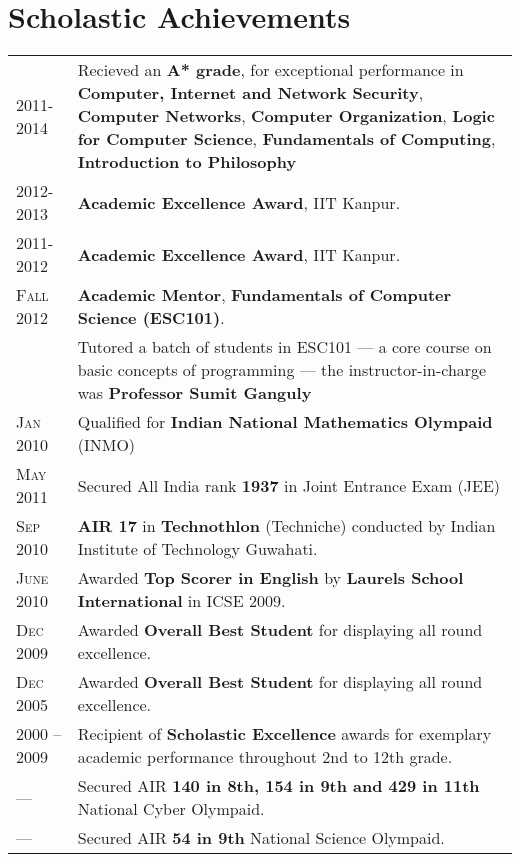\documentclass[a4paper,10pt]{article} %
\begin{document}
\section{Scholastic Achievements}

\begin{tabular}{>{\raggedleft}p{2.2cm}p{15cm}}

    \textsc{2011-2014}   & Recieved an \textbf{A* grade}, for exceptional performance in
                            \textbf{Computer, Internet and Network Security},
                            \textbf{Computer Networks},
                            \textbf{Computer Organization},
                            \textbf{Logic for Computer Science},
                            \textbf{Fundamentals of Computing},
                            \textbf{Introduction to Philosophy} \\
    \textsc{2012-2013}   & \textbf{Academic Excellence Award}, IIT Kanpur. \\
    \textsc{2011-2012}   & \textbf{Academic Excellence Award}, IIT Kanpur. \\
    \textsc{Fall 2012}   & \textbf{Academic Mentor}, \textbf{Fundamentals of Computer Science (ESC101)}. \\
                         & \footnotesize{Tutored a batch of students in ESC101 --- a core course on
                            basic concepts of programming --- the instructor-in-charge was \textbf{Professor
                            Sumit Ganguly}}\\
    \textsc{Jan 2010}    & Qualified for \textbf{Indian National Mathematics Olympaid} (INMO) \\
    \textsc{May 2011}    & Secured All India rank \textbf{1937} in Joint Entrance Exam (JEE) \\
    \textsc{Sep 2010}    & \textbf{AIR 17} in \textbf{Technothlon} (Techniche) conducted by Indian Institute of Technology Guwahati. \\
    \textsc{June 2010}   & Awarded \textbf{Top Scorer in English} by \textbf{Laurels School International} in ICSE 2009. \\
    \textsc{Dec 2009}    & Awarded \textbf{Overall Best Student} for displaying all round excellence. \\
    \textsc{Dec 2005}    & Awarded \textbf{Overall Best Student} for displaying all round excellence. \\
    \textsc{2000 -- 2009} & Recipient of \textbf{Scholastic Excellence} awards for exemplary academic
                           performance throughout 2nd to 12th grade. \\
    \textsc{---} & Secured AIR \textbf{140 in 8th, 154 in 9th and 429 in 11th} National Cyber Olympaid.\\
    \textsc{---} & Secured AIR \textbf{54 in 9th} National Science Olympaid.\\

\end{tabular}
\end{document}
